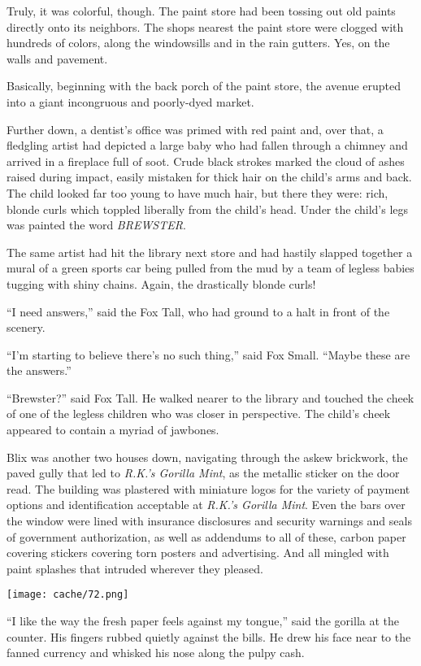 \documentclass[12pt,twoside]{report}
\begin{document}
Truly, it was colorful, though.  The paint store had been tossing out
old paints directly onto its neighbors.  The shops nearest the paint
store were clogged with hundreds of colors, along the windowsills and
in the rain gutters.  Yes, on the walls and pavement.

Basically, beginning with the back porch of the paint store, the
avenue erupted into a giant incongruous and poorly-dyed market.

Further down, a dentist's office was primed with red paint and, over
that, a fledgling artist had depicted a large baby who had fallen
through a chimney and arrived in a fireplace full of soot. Crude black
strokes marked the cloud of ashes raised during impact, easily
mistaken for thick hair on the child's arms and back.  The child
looked far too young to have much hair, but there they were: rich,
blonde curls which toppled liberally from the child's head.  Under the
child's legs was painted the word {\em BREWSTER}.

The same artist had hit the library next store and had hastily slapped
together a mural of a green sports car being pulled from the mud by a
team of legless babies tugging with shiny chains. Again, the
drastically blonde curls!

``I need answers,'' said the Fox Tall, who had ground to a halt in
front of the scenery.

``I'm starting to believe there's no such thing,'' said Fox Small.
``Maybe these are the answers.''

``Brewster?'' said Fox Tall.  He walked nearer to the library and
touched the cheek of one of the legless children who was closer in
perspective.  The child's cheek appeared to contain a myriad of
jawbones.

Blix was another two houses down, navigating through the askew
brickwork, the paved gully that led to {\em R.K.'s Gorilla Mint}, as
the metallic sticker on the door read.  The building was plastered
with miniature logos for the variety of payment options and
identification acceptable at {\em R.K.'s Gorilla Mint}.  Even the bars
over the window were lined with insurance disclosures and security
warnings and seals of government authorization, as well as addendums
to all of these, carbon paper covering stickers covering torn posters
and advertising.  And all mingled with paint splashes that intruded
wherever they pleased.

	\texttt{[image: cache/72.png]}

``I like the way the fresh paper feels against my tongue,'' said the
        gorilla at the counter. His fingers rubbed quietly against the
        bills.  He drew his face near to the fanned currency and
        whisked his nose along the pulpy cash.
\end{document}
